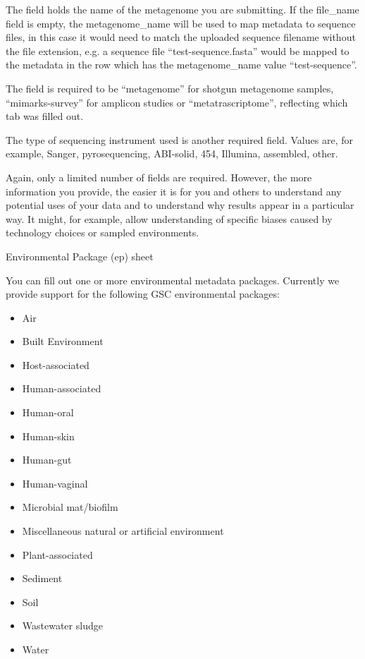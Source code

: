 \documentclass[letterpaper,10pt,english]{sphinxmanual}
\begin{document}
The  field holds the name of the metagenome you are
submitting. If the file\_name field is empty, the metagenome\_name will be
used to map metadata to sequence files, in this case it would need to
match the uploaded sequence filename without the file extension, e.g. a
sequence file “test-sequence.fasta” would be mapped to the metadata in
the row which has the metagenome\_name value “test-sequence”.

The  field is required to be “metagenome” for
shotgun metagenome samples, “mimarks-survey” for amplicon studies or
“metatrascriptome”, reflecting which tab was filled out.

The type of sequencing instrument used is another required field. Values
are, for example, Sanger, pyrosequencing, ABI-solid, 454, Illumina,
assembled, other.

Again, only a limited number of fields are required. However, the more
information you provide, the easier it is for you and others to
understand any potential uses of your data and to understand why results
appear in a particular way. It might, for example, allow understanding
of specific biases caused by technology choices or sampled environments.

Environmental Package (ep) sheet

You can fill out one or more environmental metadata packages. Currently
we provide support for the following GSC environmental packages:
\begin{itemize}
\item {} 
Air

\item {} 
Built Environment

\item {} 
Host-associated

\item {} 
Human-associated

\item {} 
Human-oral

\item {} 
Human-skin

\item {} 
Human-gut

\item {} 
Human-vaginal

\item {} 
Microbial mat/biofilm

\item {} 
Miscellaneous natural or artificial environment

\item {} 
Plant-associated

\item {} 
Sediment

\item {} 
Soil

\item {} 
Wastewater sludge

\item {} 
Water

\end{itemize}
\end{document}
